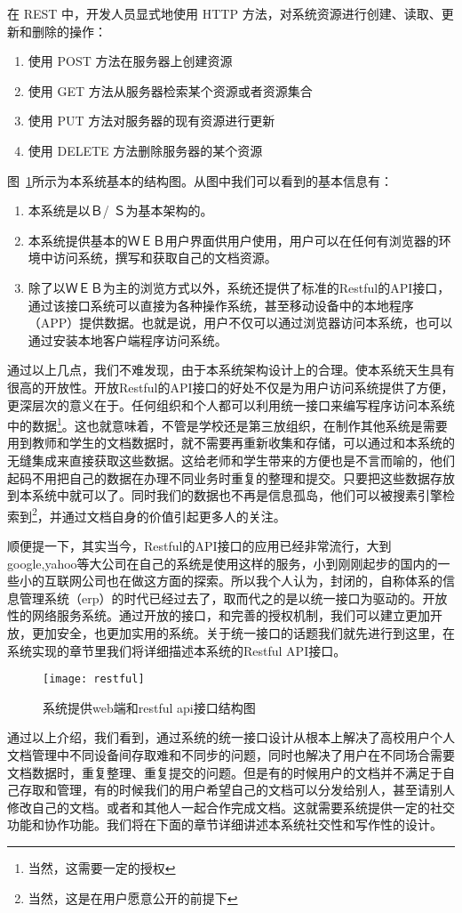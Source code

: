 在 REST 中，开发人员显式地使用 HTTP 方法，对系统资源进行创建、读取、更新和删除的操作：
\begin{enumerate}
\item 使用 POST 方法在服务器上创建资源
\item 使用 GET 方法从服务器检索某个资源或者资源集合
\item 使用 PUT 方法对服务器的现有资源进行更新
\item 使用 DELETE 方法删除服务器的某个资源
\end{enumerate}

图~\ref{fig:xfig9}所示为本系统基本的结构图。从图中我们可以看到的基本信息有：
\begin{enumerate}
\item 本系统是以Ｂ/ Ｓ为基本架构的。
\item 本系统提供基本的ＷＥＢ用户界面供用户使用，用户可以在任何有浏览器的环境中访问系统，撰写和获取自己的文档资源。
\item 除了以ＷＥＢ为主的浏览方式以外，系统还提供了标准的Restful的API接口，通过该接口系统可以直接为各种操作系统，甚至移动设备中的本地程序（APP）提供数据。也就是说，用户不仅可以通过浏览器访问本系统，也可以通过安装本地客户端程序访问系统。
\end{enumerate}
通过以上几点，我们不难发现，由于本系统架构设计上的合理。使本系统天生具有很高的开放性。开放Restful的API接口的好处不仅是为用户访问系统提供了方便，更深层次的意义在于。任何组织和个人都可以利用统一接口来编写程序访问本系统中的数据\footnote{当然，这需要一定的授权}。这也就意味着，不管是学校还是第三放组织，在制作其他系统是需要用到教师和学生的文档数据时，就不需要再重新收集和存储，可以通过和本系统的无缝集成来直接获取这些数据。这给老师和学生带来的方便也是不言而喻的，他们起码不用把自己的数据在办理不同业务时重复的整理和提交。只要把这些数据存放到本系统中就可以了。同时我们的数据也不再是信息孤岛，他们可以被搜素引擎检索到\footnote{当然，这是在用户愿意公开的前提下}，并通过文档自身的价值引起更多人的关注。

顺便提一下，其实当今，Restful的API接口的应用已经非常流行，大到 google,yahoo等大公司在自己的系统是使用这样的服务，小到刚刚起步的国内的一些小的互联网公司也在做这方面的探索。所以我个人认为，封闭的，自称体系的信息管理系统（erp）的时代已经过去了，取而代之的是以统一接口为驱动的。开放性的网络服务系统。通过开放的接口，和完善的授权机制，我们可以建立更加开放，更加安全，也更加实用的系统。关于统一接口的话题我们就先进行到这里，在系统实现的章节里我们将详细描述本系统的Restful API接口。
\begin{figure}[H]
  \centering
  \texttt{[image: restful]}
  \caption{系统提供web端和restful api接口结构图}
  \label{fig:xfig9}
\end{figure}
通过以上介绍，我们看到，通过系统的统一接口设计从根本上解决了高校用户个人文档管理中不同设备间存取难和不同步的问题，同时也解决了用户在不同场合需要文档数据时，重复整理、重复提交的问题。但是有的时候用户的文档并不满足于自己存取和管理，有的时候我们的用户希望自己的文档可以分发给别人，甚至请别人修改自己的文档。或者和其他人一起合作完成文档。这就需要系统提供一定的社交功能和协作功能。我们将在下面的章节详细讲述本系统社交性和写作性的设计。



